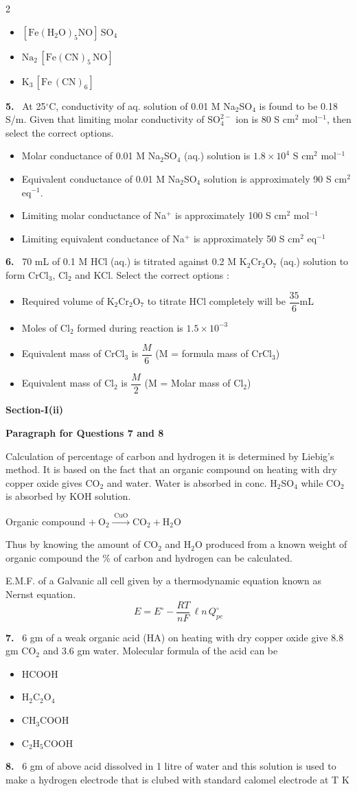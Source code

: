 \documentclass[10pt]{extarticle}
\newcommand{\sect}[1]{\par\smallskip\noindent\textbf{#1}\par}
\newcommand{\qn}[1]{\par\smallskip\noindent\textbf{#1.}~}
\newcommand{\paraq}[2]{\par\smallskip\noindent\textbf{Paragraph for Questions #1 and #2}\par}
\newenvironment{qoptions}{\begin{itemize}[leftmargin=1.8em,itemsep=1pt,topsep=2pt,label={}]}{\end{itemize}}
\newcommand{\opt}[2]{\item[(#1)] #2}
\begin{document}
\begin{multicols}{2}
\begin{qoptions}
\opt{B}{$[\mathrm{Fe(H_2O)_5NO}]\,\mathrm{SO_4}$}
\opt{C}{$\mathrm{Na_2}\,[\mathrm{Fe(CN)_5\,NO}]$}
\opt{D}{$\mathrm{K_3}\,[\mathrm{Fe\,(CN)_6}]$}
\end{qoptions}
\qn{5} At 25$^\circ$C, conductivity of aq. solution of 0.01 M Na$_2$SO$_4$ is found to be 0.18 S/m. Given that limiting molar conductivity of $\mathrm{SO_4^{2-}}$ ion is 80 S cm$^2$ mol$^{-1}$, then select the correct options.
\begin{qoptions}
\opt{A}{Molar conductance of 0.01 M Na$_2$SO$_4$ (aq.) solution is $1.8\times10^4$ S cm$^2$ mol$^{-1}$}
\opt{B}{Equivalent conductance of 0.01 M Na$_2$SO$_4$ solution is approximately 90 S cm$^2$ eq$^{-1}$.}
\opt{C}{Limiting molar conductance of Na$^+$ is approximately 100 S cm$^2$ mol$^{-1}$}
\opt{D}{Limiting equivalent conductance of Na$^+$ is approximately 50 S cm$^2$ eq$^{-1}$}
\end{qoptions}
\qn{6} 70 mL of 0.1 M HCl (aq.) is titrated against 0.2 M K$_2$Cr$_2$O$_7$ (aq.) solution to form CrCl$_3$, Cl$_2$ and KCl. Select the correct options :
\begin{qoptions}
\opt{A}{Required volume of K$_2$Cr$_2$O$_7$ to titrate HCl completely will be $\dfrac{35}{6}$mL}
\opt{B}{Moles of Cl$_2$ formed during reaction is $1.5\times10^{-3}$}
\opt{C}{Equivalent mass of CrCl$_3$ is $\dfrac M6$ (M = formula mass of CrCl$_3$)}
\opt{D}{Equivalent mass of Cl$_2$ is $\dfrac M2$ (M = Molar mass of Cl$_2$)}
\end{qoptions}
\sect{Section-I(ii)}
\paraq{7}{8}
Calculation of percentage of carbon and hydrogen it is determined by Liebig's method. It is based on the fact that an organic compound on heating with dry copper oxide gives CO$_2$ and water. Water is absorbed in conc. H$_2$SO$_4$ while CO$_2$ is absorbed by KOH solution.

Organic compound $+\ \mathrm{O_2}\xrightarrow{\;\mathrm{CuO}\;}\mathrm{CO_2}+\mathrm{H_2O}$

Thus by knowing the amount of CO$_2$ and H$_2$O produced from a known weight of organic compound the \% of carbon and hydrogen can be calculated.

E.M.F. of a Galvanic all cell given by a thermodynamic equation known as Nernst equation.
\[E=E^\circ-\dfrac{RT}{nF}\,\ell n\,Q^{\circ}_{pc}\]
\qn{7} 6 gm of a weak organic acid (HA) on heating with dry copper oxide give 8.8 gm CO$_2$ and 3.6 gm water. Molecular formula of the acid can be
\begin{qoptions}
\opt{A}{HCOOH}
\opt{B}{H$_2$C$_2$O$_4$}
\opt{C}{CH$_3$COOH}
\opt{D}{C$_2$H$_5$COOH}
\end{qoptions}
\qn{8} 6 gm of above acid dissolved in 1 litre of water and this solution is used to make a hydrogen electrode that is clubed with standard calomel electrode at T K


\end{multicols}
\end{document}
